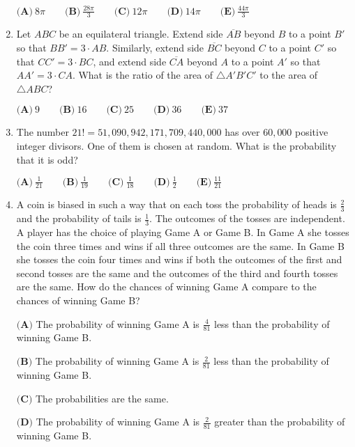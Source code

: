\documentclass{article}
\begin{document}
\begin{enumerate}[label=\arabic*., itemsep=0.5em]
$\textbf{(A)}\ 8\pi \qquad \textbf{(B)}\ \frac{28\pi}{3} \qquad \textbf{(C)}\ 12\pi \qquad \textbf{(D)}\ 14\pi \qquad \textbf{(E)}\ \frac{44\pi}{3}$\par \vspace{0.5em}\item Let $ABC$ be an equilateral triangle. Extend side $\overline{AB}$ beyond $B$ to a point $B'$ so that $BB'=3 \cdot AB$. Similarly, extend side $\overline{BC}$ beyond $C$ to a point $C'$ so that $CC'=3 \cdot BC$, and extend side $\overline{CA}$ beyond $A$ to a point $A'$ so that $AA'=3 \cdot CA$. What is the ratio of the area of $\triangle A'B'C'$ to the area of $\triangle ABC$?

$\textbf{(A)}\ 9\qquad\textbf{(B)}\ 16\qquad\textbf{(C)}\ 25\qquad\textbf{(D)}\ 36\qquad\textbf{(E)}\ 37$\par \vspace{0.5em}\item The number $21!=51,090,942,171,709,440,000$ has over $60,000$ positive integer divisors. One of them is chosen at random. What is the probability that it is odd?

$\textbf{(A)}\ \frac{1}{21} \qquad \textbf{(B)}\ \frac{1}{19} \qquad \textbf{(C)}\ \frac{1}{18} \qquad \textbf{(D)}\ \frac{1}{2} \qquad \textbf{(E)}\ \frac{11}{21}$\par \vspace{0.5em}\item A coin is biased in such a way that on each toss the probability of heads is $\frac{2}{3}$ and the probability of tails is $\frac{1}{3}$. The outcomes of the tosses are independent. A player has the choice of playing Game A or Game B. In Game A she tosses the coin three times and wins if all three outcomes are the same. In Game B she tosses the coin four times and wins if both the outcomes of the first and second tosses are the same and the outcomes of the third and fourth tosses are the same. How do the chances of winning Game A compare to the chances of winning Game B?

$\textbf{(A)}$ The probability of winning Game A is $\frac{4}{81}$ less than the probability of winning Game B.

$\textbf{(B)}$ The probability of winning Game A is $\frac{2}{81}$ less than the probability of winning Game B.

$\textbf{(C)}$ The probabilities are the same.

$\textbf{(D)}$ The probability of winning Game A is $\frac{2}{81}$ greater than the probability of winning Game B.


\end{enumerate}
\end{document}
